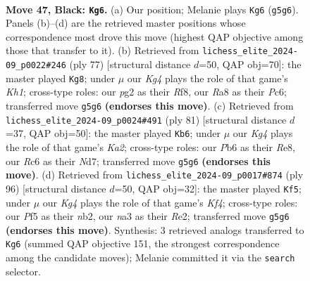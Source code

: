 \documentclass[11pt]{article}
\begin{document}
\clearpage

\begin{figure}[p]\centering
\begin{subfigure}{0.46\textwidth}\centering
\resizebox{\linewidth}{!}{%
\newchessgame
\chessboard[
  setfen={r7/pn6/1pr1p2p/5pk1/2P5/N1B1PP1R/P5P1/2R2K2 b - - 2 47},
  showmover=false,
  pgfstyle=straightmove, color=movearrow, markmove={g5-g6}
]}
\caption{}
\end{subfigure}\hfill
\begin{subfigure}{0.46\textwidth}\centering
\resizebox{\linewidth}{!}{%
\newchessgame
\chessboard[
  setfen={5r1k/1p1R2p1/2p3Bp/2P4P/pr3p2/4p3/1P4P1/1R4K1 b - - 0 39},
  showmover=false,
  pgfstyle=straightmove, color=movearrow, markmove={h8-g8}
]}
\caption{}
\end{subfigure}
\\[4pt]
\begin{subfigure}{0.46\textwidth}\centering
\resizebox{\linewidth}{!}{%
\newchessgame
\chessboard[
  setfen={4r3/k2n1p1r/p3p3/1p2P3/2p1R3/P2pNB1P/1P3P1K/1R6 b - - 1 41},
  showmover=false,
  pgfstyle=straightmove, color=movearrow, markmove={a7-b6}
]}
\caption{}
\end{subfigure}\hfill
\begin{subfigure}{0.46\textwidth}\centering
\resizebox{\linewidth}{!}{%
\newchessgame
\chessboard[
  setfen={8/6k1/1p2r2p/p1p1P3/3p1KP1/1P3N1P/1nP1R3/8 w - - 0 49},
  showmover=false,
  pgfstyle=straightmove, color=movearrow, markmove={f4-f5}
]}
\caption{}
\end{subfigure}
\caption{\textbf{Move 47, Black: \texttt{Kg6}.} (a) Our position; Melanie plays \texttt{Kg6} (\texttt{g5g6}). Panels (b)--(d) are the retrieved master positions whose correspondence most drove this move (highest QAP objective among those that transfer to it). (b) Retrieved from \texttt{lichess\_elite\_2024-09\_p0022\#246} (ply 77) [structural distance $d$=50, QAP obj=70]: the master played \texttt{Kg8}; under $\mu$ our \emph{Kg4} plays the role of that game's \emph{Kh1}; cross-type roles: our \emph{p}g2 as their \emph{R}f8, our \emph{R}a8 as their \emph{P}c6; transferred move \texttt{g5g6} \textbf{(endorses this move)}. (c) Retrieved from \texttt{lichess\_elite\_2024-09\_p0024\#491} (ply 81) [structural distance $d$=37, QAP obj=50]: the master played \texttt{Kb6}; under $\mu$ our \emph{Kg4} plays the role of that game's \emph{Ka2}; cross-type roles: our \emph{P}b6 as their \emph{R}e8, our \emph{R}c6 as their \emph{N}d7; transferred move \texttt{g5g6} \textbf{(endorses this move)}. (d) Retrieved from \texttt{lichess\_elite\_2024-09\_p0017\#874} (ply 96) [structural distance $d$=50, QAP obj=32]: the master played \texttt{Kf5}; under $\mu$ our \emph{Kg4} plays the role of that game's \emph{Kf4}; cross-type roles: our \emph{P}f5 as their \emph{n}b2, our \emph{n}a3 as their \emph{R}e2; transferred move \texttt{g5g6} \textbf{(endorses this move)}. Synthesis: 3 retrieved analogs transferred to \texttt{Kg6} (summed QAP objective 151, the strongest correspondence among the candidate moves); Melanie committed it via the \texttt{search} selector.}
\label{fig:thought-m93}
\end{figure}
\end{document}
